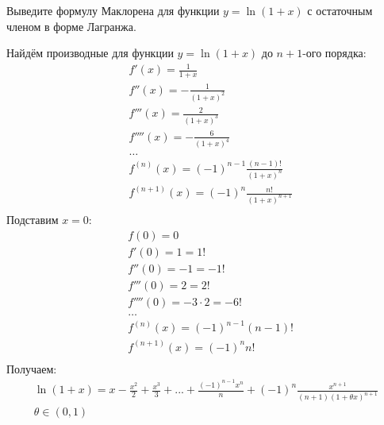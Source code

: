 \begin{question}
    Выведите формулу Маклорена для функции $y = \ln(1 + x)$ с остаточным членом в форме Лагранжа.
\end{question}
\begin{answer}
    Найдём производные для функции $y = \ln(1 + x)$ до $n + 1$-ого порядка:
    \begin{align*}
        &f'(x) = \frac{1}{1+x} \\
        &f''(x) = -\frac{1}{(1+x)^2} \\
        &f'''(x) = \frac{2}{(1+x)^3} \\
        &f''''(x) = -\frac{6}{(1+x)^4} \\
        &\ldots \\
        &f^{(n)}(x) = (-1)^{n-1} \frac{(n-1)!}{(1+x)^n} \\
        &f^{(n+1)}(x) = (-1)^{n} \frac{n!}{(1+x)^{n+1}} \\
    \end{align*}
    Подставим $x = 0$:
    \begin{align*}
        &f(0) = 0 \\
        &f'(0) = 1 = 1! \\
        &f''(0) = -1 = -1! \\
        &f'''(0) = 2 = 2! \\
        &f''''(0) = -3 \cdot 2 = -6! \\
        &\ldots \\
        &f^{(n)}(x) = (-1)^{n-1}(n-1)! \\
        &f^{(n+1)}(x) = (-1)^{n} n! \\
    \end{align*}
    Получаем:
    \begin{gather*}
        \ln(1+x) = x - \frac{x^2}{2} + \frac{x^3}{3} + ... + \frac{(-1)^{n-1} x^n}{n} + (-1)^n \frac{x ^{n+1}}{(n+1)(1 + \theta x) ^{n+1}} \\
        \theta \in (0, 1)
    \end{gather*}
\end{answer}
\pagebreak



